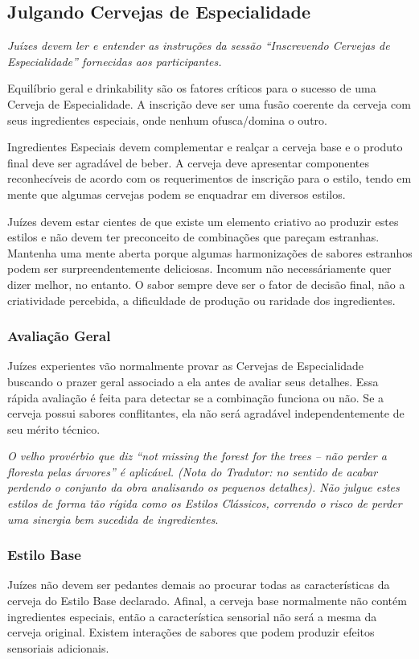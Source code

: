 \subsection*{Julgando Cervejas de Especialidade}
\textit{Juízes devem ler e entender as instruções da sessão “Inscrevendo Cervejas de Especialidade” fornecidas aos participantes.}

Equilíbrio geral e drinkability são os fatores críticos para o sucesso de uma Cerveja de Especialidade. A inscrição deve ser uma fusão coerente da cerveja com seus ingredientes especiais, onde nenhum ofusca/domina o outro.

Ingredientes Especiais devem complementar e realçar a cerveja base e o produto final deve ser agradável de beber. A cerveja deve apresentar componentes reconhecíveis de acordo com os requerimentos de inscrição para o estilo, tendo em mente que algumas cervejas podem se enquadrar em diversos estilos.

Juízes devem estar cientes de que existe um elemento criativo ao produzir estes estilos e não devem ter preconceito de combinações que pareçam estranhas. Mantenha uma mente aberta porque algumas harmonizações de sabores estranhos podem ser surpreendentemente deliciosas. Incomum não necessáriamente quer dizer melhor, no entanto. O sabor sempre deve ser o fator de decisão final, não a criatividade percebida, a dificuldade de produção ou raridade dos ingredientes.

\subsubsection*{Avaliação Geral}
Juízes experientes vão normalmente provar as Cervejas de Especialidade buscando o prazer geral associado a ela antes de avaliar seus detalhes. Essa rápida avaliação é feita para detectar se a combinação funciona ou não. Se a cerveja possui sabores conflitantes, ela não será agradável independentemente de seu mérito técnico.

\textit{O velho provérbio que diz “not missing the forest for the trees – não perder a floresta pelas árvores” é aplicável. (Nota do Tradutor: no sentido de acabar perdendo o conjunto da obra analisando os pequenos detalhes). Não julgue estes estilos de forma tão rígida como os Estilos Clássicos, correndo o risco de perder uma sinergia bem sucedida de ingredientes}.

\subsubsection*{Estilo Base}
Juízes não devem ser pedantes demais ao procurar todas as características da cerveja do Estilo Base declarado. Afinal, a cerveja base normalmente não contém ingredientes especiais, então a característica sensorial não será a mesma da cerveja original. Existem interações de sabores que podem produzir efeitos sensoriais adicionais.

